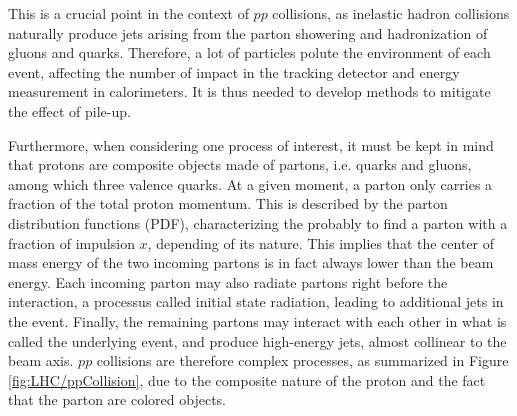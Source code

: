 
    This is a crucial point in the context of $pp$ collisions, as inelastic hadron collisions
    naturally produce jets arising from the parton showering and hadronization of gluons
    and quarks. Therefore, a lot of particles polute the environment of each event, affecting the
    number of impact in the tracking detector and energy measurement in calorimeters.
    It is thus needed to develop methods to mitigate the effect of pile-up.

    Furthermore, when considering one process of interest, it must be kept in mind that
    protons are composite objects made of partons, i.e. quarks and gluons, among which three
    valence quarks. At a given moment, a parton only carries a fraction of the total
    proton momentum. This is described by the parton distribution functions (PDF), characterizing
    the probably to find a parton with a fraction of impulsion $x$, depending of its
    nature. This implies that the center of mass energy of the two incoming partons is in
    fact always lower than the beam energy. Each incoming parton may also radiate partons
    right before the interaction, a processus called initial state radiation, leading to
    additional jets in the event. Finally, the remaining partons may interact with each
    other in what is called the underlying event, and produce high-energy jets, almost
    collinear to the beam axis.  $pp$ collisions
    are therefore complex processes, as summarized in Figure \ref{fig:LHC/ppCollision}, due
    to the composite nature of the proton and the fact that the parton are colored objects.



